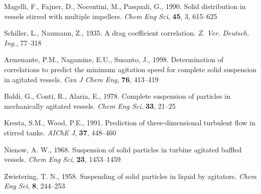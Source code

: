 \begin{thebibliography}{99}

 Magelli, F., Fajner, D., Nocentini, M., Pasquali, G., 1990. Solid distribution in vessels stirred with multiple impellers. \textit{Chem Eng Sci}, \textbf{45}, 3, 615--625

 Schiller, L., Naumann, Z., 1935. A drag coefficient correlation. \textit{Z. Ver. Deutsch. Ing.}, 77--318


 Armenante, P.M., Nagamine, E.U., Susanto, J., 1998. Determination of correlations to predict the minimum agitation speed for complete solid suspension in agitated vessels. \textit{Can J Chem Eng}, \textbf{76}, 413--419

 Baldi, G., Conti, R., Alaria, E., 1978. Complete suspension of particles in mechanically agitated vessels. \textit{Chem Eng Sci}, \textbf{33}, 21--25 

 Kresta, S.M., Wood, P.E., 1991. Prediction of three-dimensional turbulent flow in stirred tanks. \textit{AIChE J}, \textbf{37}, 448--460 

 Nienow, A. W., 1968. Suspension of solid particles in turbine agitated baffled vessels. \textit{Chem Eng Sci}, \textbf{23}, 1453--1459 

 Zwietering, T. N., 1958. Suspending of solid particles in liquid by agitators. \textit{Chem Eng Sci}, \textbf{8}, 244--253 

\end{thebibliography}

